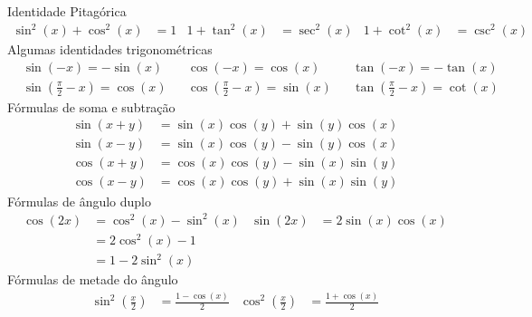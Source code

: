 Identidade Pitagórica
\begin{align*}
  \sin^2(x) + \cos^2(x) & = 1         &
  1 + \tan^2(x)         & = \sec^2(x) &
  1 + \cot^2(x)         & = \csc^2(x)
\end{align*}
Algumas identidades trigonométricas
\begin{align*}
	& \sin(-x)                         = -\sin(x)  &
	& \cos(-x)                         = \cos(x)   &
	& \tan(-x)                         = -\tan(x)  \\[5mm]
	& \sin\left(\frac{\pi}{2}-x\right) = \cos(x)   &
	& \cos\left(\frac{\pi}{2}-x\right) = \sin(x)   &
	& \tan\left(\frac{\pi}{2}-x\right) = \cot(x)
\end{align*}
Fórmulas de soma e subtração
\begin{align*}
	\sin(x+y) & = \sin(x)\cos(y) + \sin(y)\cos(x) \\
	\sin(x-y) & = \sin(x)\cos(y) - \sin(y)\cos(x) \\
	\cos(x+y) & = \cos(x)\cos(y) - \sin(x)\sin(y) \\
	\cos(x-y) & = \cos(x)\cos(y) + \sin(x)\sin(y)
\end{align*}
Fórmulas de ângulo duplo
\begin{align*}
	\cos(2x) & = \cos^2(x) - \sin^2(x) & 	\sin(2x) & = 2\sin(x)\cos(x)  \\
	         & = 2\cos^2(x) - 1        \\
	         & = 1 - 2\sin^2(x)
\end{align*}
Fórmulas de metade do ângulo
\begin{align*}
  \sin^2\left(\frac{x}{2}\right) & = \frac{1-\cos(x)}{2} &
  \cos^2\left(\frac{x}{2}\right) & = \frac{1+\cos(x)}{2}
\end{align*}

